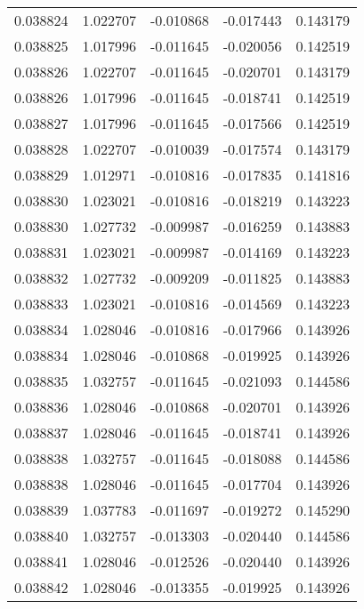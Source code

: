 \begin{tabular}{lrrrr}
0.038824    &  1.022707 & -0.010868 & -0.017443 &             0.143179 \\
0.038825    &  1.017996 & -0.011645 & -0.020056 &             0.142519 \\
0.038826    &  1.022707 & -0.011645 & -0.020701 &             0.143179 \\
0.038826    &  1.017996 & -0.011645 & -0.018741 &             0.142519 \\
0.038827    &  1.017996 & -0.011645 & -0.017566 &             0.142519 \\
0.038828    &  1.022707 & -0.010039 & -0.017574 &             0.143179 \\
0.038829    &  1.012971 & -0.010816 & -0.017835 &             0.141816 \\
0.038830    &  1.023021 & -0.010816 & -0.018219 &             0.143223 \\
0.038830    &  1.027732 & -0.009987 & -0.016259 &             0.143883 \\
0.038831    &  1.023021 & -0.009987 & -0.014169 &             0.143223 \\
0.038832    &  1.027732 & -0.009209 & -0.011825 &             0.143883 \\
0.038833    &  1.023021 & -0.010816 & -0.014569 &             0.143223 \\
0.038834    &  1.028046 & -0.010816 & -0.017966 &             0.143926 \\
0.038834    &  1.028046 & -0.010868 & -0.019925 &             0.143926 \\
0.038835    &  1.032757 & -0.011645 & -0.021093 &             0.144586 \\
0.038836    &  1.028046 & -0.010868 & -0.020701 &             0.143926 \\
0.038837    &  1.028046 & -0.011645 & -0.018741 &             0.143926 \\
0.038838    &  1.032757 & -0.011645 & -0.018088 &             0.144586 \\
0.038838    &  1.028046 & -0.011645 & -0.017704 &             0.143926 \\
0.038839    &  1.037783 & -0.011697 & -0.019272 &             0.145290 \\
0.038840    &  1.032757 & -0.013303 & -0.020440 &             0.144586 \\
0.038841    &  1.028046 & -0.012526 & -0.020440 &             0.143926 \\
0.038842    &  1.028046 & -0.013355 & -0.019925 &             0.143926 \\

\end{tabular}
